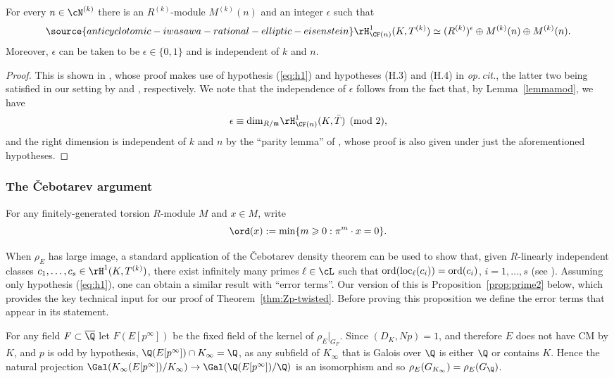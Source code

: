 \begin{prop}
\notready\label{propstructure}
For every $n\in\cN^{(k)}$ there is an $R^{(k)}$-module $M^{(k)}(n)$  and an integer $\epsilon$ such that
\begin{equation}\label{eq1}
\source{anticyclotomic-iwasawa-rational-elliptic-eisenstein}
\rH^1_{\CF(n)}(K,T^{(k)}) \simeq (R^{(k)})^\epsilon\oplus M^{(k)}(n)\oplus M^{(k)}(n).\nonumber
\end{equation}
Moreover, $\epsilon$ can be taken to be $\epsilon\in\{0,1\}$ and is independent of $k$ and $n$.
\end{prop}

\begin{proof}
This is shown in \cite[Prop.~1.5.5]{howard}, whose proof makes use of hypothesis (\ref{eq:h1}) and hypotheses (H.3) and (H.4) in \emph{op.\,cit.}, the latter two being satisfied in our setting by \cite[Lem.~3.7.1]{mazrub} and \cite[Lem.~2.2.1]{mazrub}, respectively. We note that the independence of $\epsilon$ follows from the fact that, by Lemma~\ref{lemmamod}, we have
\[
\epsilon\equiv{\rm dim}_{R/\mathfrak{m}}\rH^1_{\CF(n)}(K,\bar{T})\pmod{2},
\]
and the right dimension is independent of $k$ and $n$ by the ``parity lemma'' of \cite[Lem.~1.5.3]{howard}, whose proof is also given under just the aforementioned hypotheses.
\end{proof}


\subsubsection{The \v{C}ebotarev argument}
For any finitely-generated torsion $R$-module $M$ and $x\in M$, write
\[
\ord(x):=\min\{m\geqslant 0: \pi^m\cdot x =0\}.
\]

When $\rho_E$ has large image, a standard application of the \v{C}ebotarev density theorem can be used to show that, given $R$-linearly independent classes $c_1,\dots,c_s\in\rH^1(K,T^{(k)})$, there exist infinitely many primes $\ell\in\cL$ such
that ${\rm ord}({\rm loc}_\ell(c_i))={\rm ord}(c_i)$, $i=1,\dots,s$ (see \cite[Cor.~3.2]{mccallum}).
Assuming only hypothesis (\ref{eq:h1}), one can obtain a similar result with ``error terms''.  Our version of this is
Proposition~\ref{prop:prime2} below, which provides the key technical input for our proof of Theorem~\ref{thm:Zp-twisted}.
Before proving this proposition we define the error terms that appear in its statement.


For any field $F\subset\overline{\Q}$ let $F(E[p^\infty])$ be the fixed field of the kernel of $\rho_E|_{G_F}$.
Since $(D_K,Np)=1$, and therefore $E$ does not have CM by $K$, and $p$ is odd by hypothesis, $\Q(E[p^\infty])\cap K_\infty = \Q$,
as any subfield of $K_\infty$ that is Galois over $\Q$ is either $\Q$ or contains $K$.
Hence the natural projection
$\Gal(K_\infty(E[p^\infty])/K_\infty)\rightarrow \Gal(\Q(E[p^\infty])/\Q)$ is an isomorphism and
so $\rho_E(G_{K_\infty}) = \rho_E(G_\Q)$.

